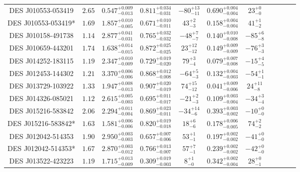 \documentclass[tradiabstract,twocolumn]{aa}
\begin{document}
{\begin{longtable}{c c c c c c c c c c c}
DES J010553-053419 &           $2.65$ & $0.547^{+0.009}_{-0.013}$ & $0.811^{+0.034}_{-0.031}$ & $-80^{+13}_{-11}$ & $0.690^{+0.004}_{-0.004}$ &    $23^{+0}_{-0}$ \\
DES J010553-053419* &           $1.69$ & $1.857^{+0.010}_{-0.005}$ & $0.671^{+0.010}_{-0.011}$ &    $43^{+2}_{-3}$ & $0.158^{+0.004}_{-0.004}$ &    $41^{+1}_{-2}$ \\
DES J010158-491738 &           $1.14$ & $2.877^{+0.041}_{-0.031}$ & $0.765^{+0.032}_{-0.032}$ &   $-48^{+7}_{-7}$ & $0.140^{+0.010}_{-0.008}$ &   $-85^{+6}_{-8}$ \\
DES J010659-443201 &           $1.74$ & $1.638^{+0.014}_{-0.015}$ & $0.872^{+0.025}_{-0.025}$ &  $23^{+12}_{-12}$ & $0.149^{+0.009}_{-0.009}$ &   $-76^{+3}_{-3}$ \\
DES J014252-183115 &           $1.19$ & $2.347^{+0.010}_{-0.009}$ & $0.729^{+0.019}_{-0.020}$ &    $79^{+3}_{-4}$ & $0.079^{+0.007}_{-0.008}$ &   $-15^{+4}_{-5}$ \\
DES J012453-144302 &           $1.21$ & $3.370^{+0.006}_{-0.006}$ & $0.868^{+0.012}_{-0.008}$ &   $-64^{+5}_{-3}$ & $0.132^{+0.004}_{-0.003}$ &   $-54^{+1}_{-1}$ \\
DES J013729-103922 &           $1.33$ & $1.947^{+0.008}_{-0.013}$ & $0.907^{+0.020}_{-0.019}$ &  $74^{+15}_{-12}$ & $0.041^{+0.009}_{-0.006}$ &   $24^{+11}_{-8}$ \\
DES J014326-085021 &           $1.12$ & $2.615^{+0.005}_{-0.003}$ & $0.695^{+0.011}_{-0.017}$ &   $-21^{+2}_{-3}$ & $0.109^{+0.003}_{-0.004}$ &   $-34^{+3}_{-4}$ \\
DES J015216-583842 &           $2.06$ & $2.294^{+0.011}_{-0.004}$ & $0.869^{+0.023}_{-0.011}$ &  $-34^{+14}_{-6}$ & $0.393^{+0.003}_{-0.002}$ &   $-10^{+0}_{-0}$ \\
DES J015216-583842* &           $1.63$ & $1.581^{+0.006}_{-0.006}$ & $0.820^{+0.019}_{-0.018}$ &    $18^{+6}_{-6}$ & $0.178^{+0.006}_{-0.005}$ &    $74^{+2}_{-2}$ \\
DES J012042-514353 &           $1.90$ & $2.950^{+0.003}_{-0.003}$ & $0.657^{+0.007}_{-0.006}$ &    $53^{+1}_{-1}$ & $0.197^{+0.002}_{-0.002}$ &   $-41^{+0}_{-0}$ \\
DES J012042-514353* &           $1.67$ & $2.870^{+0.003}_{-0.012}$ & $0.766^{+0.013}_{-0.007}$ &    $57^{+7}_{-1}$ & $0.239^{+0.002}_{-0.002}$ &   $-42^{+0}_{-0}$ \\
DES J013522-423223 &           $1.19$ & $1.715^{+0.013}_{-0.009}$ & $0.309^{+0.019}_{-0.003}$ &     $8^{+1}_{-0}$ & $0.342^{+0.002}_{-0.004}$ &    $28^{+0}_{-1}$ \\

\end{longtable}}
\end{document}

